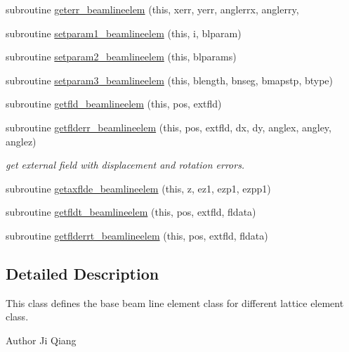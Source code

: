 \begin{DoxyCompactItemize}
\item 
subroutine \mbox{\hyperlink{namespacebeamlineelemclass_aa02696ccb3d6d48bfdcb0ff3ea906fa1}{geterr\+\_\+beamlineelem}} (this, xerr, yerr, anglerrx, anglerry,
\item 
subroutine \mbox{\hyperlink{namespacebeamlineelemclass_a2475c641494686c9c9688a8b15975cbf}{setparam1\+\_\+beamlineelem}} (this, i, blparam)
\item 
subroutine \mbox{\hyperlink{namespacebeamlineelemclass_a2ac6f016596ac46cf326e023cbb3f23b}{setparam2\+\_\+beamlineelem}} (this, blparams)
\item 
subroutine \mbox{\hyperlink{namespacebeamlineelemclass_a604cc75bca5926a1918df8c19454e41e}{setparam3\+\_\+beamlineelem}} (this, blength, bnseg, bmapstp, btype)
\item 
subroutine \mbox{\hyperlink{namespacebeamlineelemclass_a21fd373bab34a4c18c8bcf5b00816c0c}{getfld\+\_\+beamlineelem}} (this, pos, extfld)
\item 
subroutine \mbox{\hyperlink{namespacebeamlineelemclass_aa711cecfd3c01152cb0d88d88b645c4b}{getflderr\+\_\+beamlineelem}} (this, pos, extfld, dx, dy, anglex, angley, anglez)
\begin{DoxyCompactList}\small\item\em get external field with displacement and rotation errors. \end{DoxyCompactList}\item 
subroutine \mbox{\hyperlink{namespacebeamlineelemclass_aa38d23f41bd5b34e31e784e1bb1b4ba2}{getaxflde\+\_\+beamlineelem}} (this, z, ez1, ezp1, ezpp1)
\item 
subroutine \mbox{\hyperlink{namespacebeamlineelemclass_a99175508a57a532d040552a0a72bdcc1}{getfldt\+\_\+beamlineelem}} (this, pos, extfld, fldata)
\item 
subroutine \mbox{\hyperlink{namespacebeamlineelemclass_a7684dcfae71c895630dae0e95476e203}{getflderrt\+\_\+beamlineelem}} (this, pos, extfld, fldata)
\end{DoxyCompactItemize}


\subsection{Detailed Description}
This class defines the base beam line element class for different lattice element class. 

\begin{DoxyAuthor}{Author}
Ji Qiang 
\end{DoxyAuthor}


